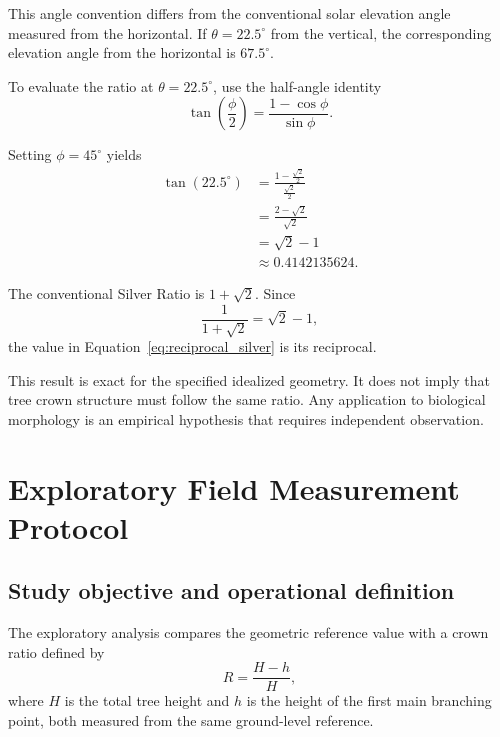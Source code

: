 \documentclass[11pt,a4paper]{article}
\begin{document}
This angle convention differs from the conventional solar
elevation angle measured from the horizontal. If
\(\theta=22.5^\circ\) from the vertical, the corresponding
elevation angle from the horizontal is \(67.5^\circ\).

To evaluate the ratio at \(\theta=22.5^\circ\), use the
half-angle identity
\begin{equation}
    \tan\left(\frac{\phi}{2}\right)
    =\frac{1-\cos\phi}{\sin\phi}.
    \label{eq:half_angle}
\end{equation}

Setting \(\phi=45^\circ\) yields
\begin{align}
    \tan(22.5^\circ)
    &=\frac{1-\frac{\sqrt{2}}{2}}
            {\frac{\sqrt{2}}{2}}\\
    &=\frac{2-\sqrt{2}}{\sqrt{2}}\\
    &=\sqrt{2}-1\\
    &\approx 0.4142135624.
    \label{eq:reciprocal_silver}
\end{align}

The conventional Silver Ratio is \(1+\sqrt{2}\). Since
\[
    \frac{1}{1+\sqrt{2}}=\sqrt{2}-1,
\]
the value in Equation~\eqref{eq:reciprocal_silver} is its
reciprocal.

This result is exact for the specified idealized geometry.
It does not imply that tree crown structure must follow the
same ratio. Any application to biological morphology is an
empirical hypothesis that requires independent observation.

\section{Exploratory Field Measurement Protocol}

\subsection{Study objective and operational definition}

The exploratory analysis compares the geometric reference value
with a crown ratio defined by
\begin{equation}
    R=\frac{H-h}{H},
    \label{eq:crown_ratio}
\end{equation}
where \(H\) is the total tree height and \(h\) is the height of
the first main branching point, both measured from the same
ground-level reference.
\end{document}
